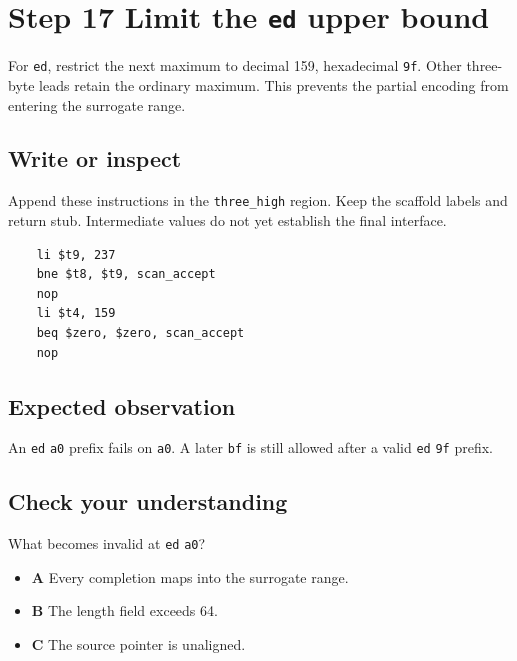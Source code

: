 \section{Step 17 Limit the \texttt{ed} upper bound}\label{utf8-s17}

For \texttt{ed}, restrict the next maximum to decimal 159, hexadecimal \texttt{9f}. Other three-byte leads retain the ordinary maximum. This prevents the partial encoding from entering the surrogate range.

\subsection{Write or inspect}
Append these instructions in the \texttt{three\_high} region. Keep the scaffold labels and return stub. Intermediate values do not yet establish the final interface.

\begin{verbatim}
    li $t9, 237
    bne $t8, $t9, scan_accept
    nop
    li $t4, 159
    beq $zero, $zero, scan_accept
    nop
\end{verbatim}

\subsection{Expected observation}
An \texttt{ed} \texttt{a0} prefix fails on \texttt{a0}. A later \texttt{bf} is still allowed after a valid \texttt{ed} \texttt{9f} prefix.

\subsection{Check your understanding}
What becomes invalid at \texttt{ed} \texttt{a0}?

\begin{itemize}
  \item \textbf{A} Every completion maps into the surrogate range.
  \item \textbf{B} The length field exceeds 64.
  \item \textbf{C} The source pointer is unaligned.
\end{itemize}
